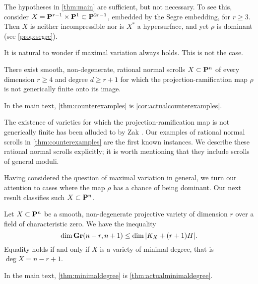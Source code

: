 \documentclass[11pt,reqno]{amsart}
\theoremstyle{plain}
\theoremstyle{definition}
\theoremstyle{remark}
\numberwithin{equation}{section}
\numberwithin{equation}{section}
\begin{document}
The hypotheses in \autoref{thm:main} are sufficient, but not necessary.
To see this, consider $X = \P^{r-1} \times \P^1 \subset \P^{2r-1}$, embedded by the Segre embedding, for $r \geq 3$.
Then $X$ is neither incompressible nor is $X^*$ a hypersurface, and yet $\rho$ is dominant (see \autoref{prop:segre}).

It is natural to wonder if maximal variation always holds.
This is not the case.
\begin{maintheorem}
  \label{thm:counterexamples}
  There exist smooth, non-degenerate, rational normal scrolls $X \subset \P^{n}$ of every dimension $r \geq 4$ and degree $d \geq r+1$ for which the projection-ramification map $\rho$ is not generically finite onto its image.
\end{maintheorem}
In the main text, \autoref{thm:counterexamples} is \autoref{cor:actualcounterexamples}.

The existence of varieties for which the projection-ramification map is not generically finite has been alluded to by Zak \cite{zak:}. Our examples of rational normal scrolls in \autoref{thm:counterexamples} are the first known instances.
We describe these rational normal scrolls  explicitly; it is worth mentioning that they include scrolls of general moduli.

Having considered the question of maximal variation in general, we turn our attention to cases where the map $\rho$ has a chance of being dominant.
Our next result classifies such $X \subset \P^n$.
\begin{maintheorem}\label{thm:minimaldegree}
  Let $X \subset \P^{n}$ be a smooth, non-degenerate projective variety of dimension $r$ over a field of characteristic zero.
  We have the inequality
  \[ \dim \Gr(n-r, n+1) \leq \dim |K_X + (r+1)H|.\]
  Equality holds if and only if $X$ is a variety of minimal degree, that is $\deg X = n-r+1$.
\end{maintheorem}
In the main text, \autoref{thm:minimaldegree} is \autoref{thm:actualminimaldegree}.
\end{document}
